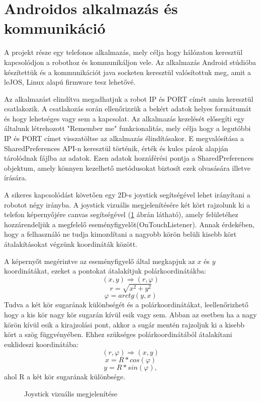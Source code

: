 \section{Androidos alkalmazás és kommunikáció}\label{sec:MEGVALOSITAS:android}
A projekt része egy telefonos alkalmazás, mely célja hogy hálózaton keresztül kapcsolódjon a robothoz és kommunikáljon vele. Az alkalmazás Android stúdióba készítettük és a kommunikációt java socketen keresztül valósítottuk meg, amit a leJOS, Linux alapú firmware tesz lehetővé.

Az alkalmazást elindítva megadhatjuk a robot IP és PORT címét amin keresztül csatlakozik. A csatlakozás során ellenőrizzük a bekért adatok helyes formátumát és hogy lehetséges vagy sem a kapcsolat. Az alkalmazás kezelését elősegíti egy általunk létrehozott "Remember me" funkcionalitás, mely célja hogy a legutóbbi IP és PORT címet visszatöltse az alkalmazás élindításakor. E megvalósítása a SharedPreferences API-n keresztül történik, érték és kulcs párok alapján tárolódnak fájlba az adatok. Ezen adatok hozzáférési pontja a SharedPreferences objektum, amely könnyen kezelhető metódusokat biztosít ezek olvasására illetve írására.

A sikeres kapcsolódást követően egy 2D-s joystick segítségével lehet irányítani a robotot négy irányba. A joystick vizuális megjelenítésére két kört rajzolunk ki a telefon képernyőjére canvas segítségével (\ref{fig:joystick} ábrán látható), amely felületéhez hozzárendeljük a megfelelő eseményfigyelőt(OnTouchListener). Annak érdekében, hogy a felhasználó ne tudja kimozdítani a nagyobb körön belüli kisebb kört átalakításokat végzünk koordináták között.

A képernyőt megérintve az eseményfigyelő által megkapjuk az $x$ és $y$ koordinátákat, ezeket a pontokat átalakítjuk polárkoordinátákba: $$(x,y) \Longrightarrow (r,\varphi)$$ $$r=\sqrt{x^2+y^2}$$ $$\varphi=arctg(y,x)$$ Tudva a két kör sugarának különbségét és a polárkoordinátákat, leellenőrizhető hogy a kis kör nagy kör sugarán kívül esik vagy sem. Abban az esetben ha a nagy körön kívül esik a kirajzolási pont, akkor a sugár mentén rajzoljuk ki a kisebb kört a szög függvényében. Ehhez szükséges polárkoordinátából átalakítani euklideszi koordinátába:  $$(r,\varphi) \Longrightarrow (x,y)$$ $$x=R*cos(\varphi)$$ $$y=R*sin(\varphi),$$ ahol R a két kör sugarának különbsége.

\begin{figure}[!htb]
	\centering
	\caption{Joystick vizuális megjelenítése}
	\label{fig:joystick}
\end{figure}

